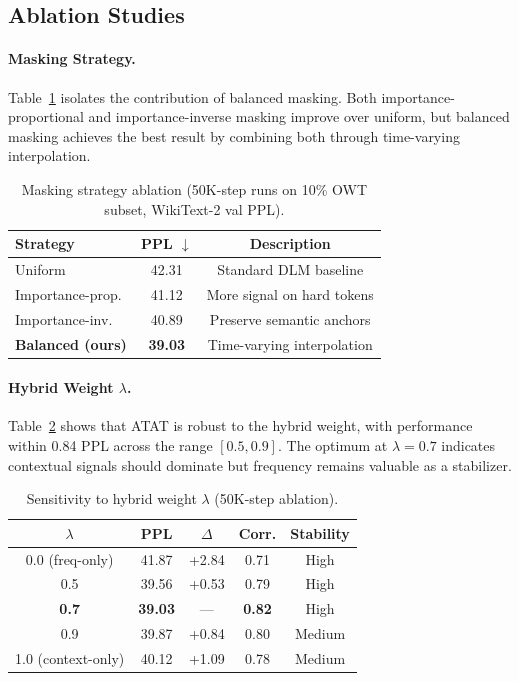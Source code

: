 \documentclass[11pt]{article}
\theoremstyle{remark}
\begin{document}
\subsection{Ablation Studies}
\label{sec:ablations}

\paragraph{Masking Strategy.} Table~\ref{tab:masking-ablation} isolates the contribution of balanced masking. Both importance-proportional and importance-inverse masking improve over uniform, but balanced masking achieves the best result by combining both through time-varying interpolation.

\begin{table}[t]
\centering
\caption{Masking strategy ablation (50K-step runs on 10\% OWT subset, WikiText-2 val PPL).}
\label{tab:masking-ablation}
\small
\begin{tabular}{lcc}
\toprule
\textbf{Strategy} & \textbf{PPL} $\downarrow$ & \textbf{Description} \\
\midrule
Uniform & 42.31 & Standard DLM baseline \\
Importance-prop. & 41.12 & More signal on hard tokens \\
Importance-inv. & 40.89 & Preserve semantic anchors \\
\textbf{Balanced (ours)} & \textbf{39.03} & Time-varying interpolation \\
\bottomrule
\end{tabular}
\end{table}

\paragraph{Hybrid Weight $\lambda$.} Table~\ref{tab:lambda-sensitivity} shows that ATAT is robust to the hybrid weight, with performance within 0.84 PPL across the range $[0.5, 0.9]$. The optimum at $\lambda = 0.7$ indicates contextual signals should dominate but frequency remains valuable as a stabilizer.

\begin{table}[t]
\centering
\caption{Sensitivity to hybrid weight $\lambda$ (50K-step ablation).}
\label{tab:lambda-sensitivity}
\small
\begin{tabular}{ccccc}
\toprule
$\lambda$ & \textbf{PPL} & $\Delta$ & \textbf{Corr.} & \textbf{Stability} \\
\midrule
0.0 (freq-only) & 41.87 & +2.84 & 0.71 & High \\
0.5 & 39.56 & +0.53 & 0.79 & High \\
\textbf{0.7} & \textbf{39.03} & --- & \textbf{0.82} & High \\
0.9 & 39.87 & +0.84 & 0.80 & Medium \\
1.0 (context-only) & 40.12 & +1.09 & 0.78 & Medium \\
\bottomrule
\end{tabular}
\end{table}
\end{document}
